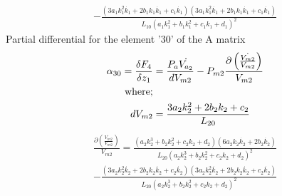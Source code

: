 \documentclass[11pt,a4paper]{article}
\begin{document}
\begin{appendices}
\begin{multline*}
        - \frac{(3 a_1 k_{1}^2 \dot{k_{1}} + 2 b_1 k_{1} \dot{k_{1}} + c_1 \dot{k_{1}}) 
                (3 a_1 k_{1}^2 \dot{k_{1}} + 2 b_1 k_{1} \dot{k_{1}} + c_1 \dot{k_{1}})}
            {L_{10} (a_1 k_{1}^2 + b_1 k_{1}^2 + c_1 k_{1} + d_1)^2}
\end{multline*}
Partial differential for the element '30' of the A matrix\newline
\begin{align}
    \alpha_{30} = \fdv{F_4}{z_1} &= \frac{P_a \dot{V_{a_2}}}{dV_{m2}} - P_{m2} \frac{\partial \left(\frac{\dot{V_{m2}}}{V_{m2}}\right)}{V_{m2}}
    \label{math:alpha_30_matrix}\\
    \text{where;}\nonumber\\
    dV_{m2} &= \frac{3 a_2 k_{2}^2 + 2 b_2 k_{2} + c_2}{L_{20}}\nonumber
\end{align}
\begin{multline*}
    \frac{\partial \left(\frac{\dot{V_{m2}}}{V_{m2}}\right)}{V_{m2}} =
        \frac{(a_2 k_{2}^3 + b_2 k_{2}^2 + c_2 k_{2} + d_2) 
                (6 a_2 k_{2} \dot{k_{2}} + 2 b_2 \dot{k_{2}})}
            {L_{20} (a_2 k_{2}^3 + b_2 k_{2}^2 + c_2 k_{2} + d_2)^2}\\
        - \frac{(3 a_2 k_{2}^2 \dot{k_{2}} + 2 b_2 k_{2} \dot{k_{2}} + c_2 \dot{k_{2}})
                (3 a_2 k_{2}^2 \dot{k_{2}} + 2 b_2 k_{2} \dot{k_{2}} + c_2 \dot{k_{2}})}
            {L_{20} (a_2 k_{2}^3 + b_2 k_{2}^2 + c_2 k_{2} + d_2)^2}
\end{multline*}


\end{appendices}
\end{document}

